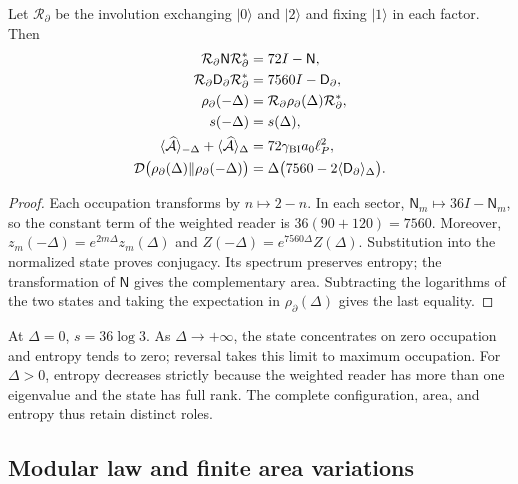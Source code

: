 \begin{theorem}
\label{vii:thm:inversion-sectorial}
Let \(\mathcal R_\partial\) be the involution exchanging
\(|0\rangle\) and \(|2\rangle\) and fixing \(|1\rangle\) in each
factor. Then
\begin{align}
 \mathcal R_\partial\mathsf N\mathcal R_\partial^*&=72I-\mathsf N,\\
 \mathcal R_\partial\mathsf D_\partial\mathcal R_\partial^*
 &=7560I-\mathsf D_\partial,\\
 \rho_\partial(-\Delta)&=\mathcal R_\partial\rho_\partial(\Delta)
                          \mathcal R_\partial^*,\\
 s(-\Delta)&=s(\Delta),\\
 \langle\widehat{\mathcal A}\rangle_{-\Delta}
 +\langle\widehat{\mathcal A}\rangle_\Delta
 &=72\gamma_{\rm BI}a_0\ell_P^2,\\
 \mathcal D\bigl(\rho_\partial(\Delta)\Vert\rho_\partial(-\Delta)\bigr)
 &=\Delta\bigl(7560-2\langle\mathsf D_\partial\rangle_\Delta\bigr).
 \label{vii:eq:inversion-sectorial}
\end{align}
\end{theorem}
\begin{proof}
Each occupation transforms by \(n\mapsto2-n\). In each sector,
\(\mathsf N_m\mapsto36I-\mathsf N_m\), so the constant
term of the weighted reader is \(36(90+120)=7560\).
Moreover, \(z_m(-\Delta)=e^{2m\Delta}z_m(\Delta)\) and
\(Z(-\Delta)=e^{7560\Delta}Z(\Delta)\). Substitution into the
normalized state proves conjugacy. Its spectrum preserves entropy;
the transformation of \(\mathsf N\) gives the complementary area. Subtracting
the logarithms of the two states and taking the expectation in
\(\rho_\partial(\Delta)\) gives the last equality.
\end{proof}

At \(\Delta=0\), \(s=36\log3\). As \(\Delta\to+\infty\),
the state concentrates on zero occupation and entropy tends to zero;
reversal takes this limit to maximum occupation. For \(\Delta>0\),
entropy decreases strictly because the weighted reader has more
than one eigenvalue and the state has full rank. The complete
configuration, area, and entropy thus retain distinct roles.

\subsection{Modular law and finite area variations}
\label{vii:subsec:ley-modular-finita}

